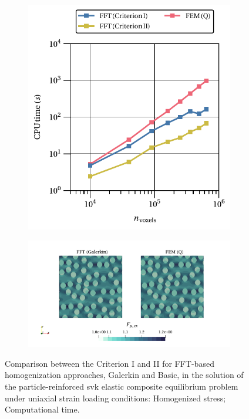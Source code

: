\begin{figure}[hbt]
\begin{subfigure}[b]{0.49\textwidth}
    \includegraphics[width=\textwidth]{figures/svk_2D_normal_cpu_time_vs_n_voxels}
    \caption{}
    \label{subfig:svk_2D_normal_cpu_time_vs_n_voxels}
  \end{subfigure}
  \begin{subfigure}[b]{\textwidth}
    \centering
    \includegraphics[width=\textwidth]{figures/svk_2D_normal_strain_11}
    \caption{}
    \label{subfig:svk_2D_normal_strain_11}
  \end{subfigure}
\caption{Comparison between the Criterion I and II for FFT-based homogenization approaches, Galerkin and Basic, in the
solution of the particle-reinforced svk elastic composite equilibrium problem under uniaxial
strain loading conditions:  Homogenized stress;  Computational time.}
\label{fig:svk_2D_normal_comparison_crit}
\end{figure}

